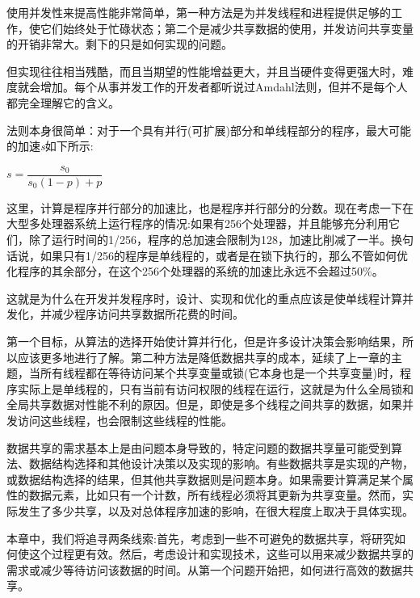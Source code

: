 使用并发性来提高性能非常简单，第一种方法是为并发线程和进程提供足够的工作，使它们始终处于忙碌状态；第二个是减少共享数据的使用，并发访问共享变量的开销非常大。剩下的只是如何实现的问题。

但实现往往相当残酷，而且当期望的性能增益更大，并且当硬件变得更强大时，难度就会增加。每个从事并发工作的开发者都听说过Amdahl法则，但并不是每个人都完全理解它的含义。

法则本身很简单：对于一个具有并行(可扩展)部分和单线程部分的程序，最大可能的加速\textit{s}如下所示:

\begin{center}
$ s = \dfrac{s_0}{s_0(1-p)+p} $
\end{center}

这里，计算是程序并行部分的加速比，也是程序并行部分的分数。现在考虑一下在大型多处理器系统上运行程序的情况:如果有256个处理器，并且能够充分利用它们，除了运行时间的1/256，程序的总加速会限制为128，加速比削减了一半。换句话说，如果只有1/256的程序是单线程的，或者是在锁下执行的，那么不管如何优化程序的其余部分，在这个256个处理器的系统的加速比永远不会超过50\%。

这就是为什么在开发并发程序时，设计、实现和优化的重点应该是使单线程计算并发化，并减少程序访问共享数据所花费的时间。

第一个目标，从算法的选择开始使计算并行化，但是许多设计决策会影响结果，所以应该更多地进行了解。第二种方法是降低数据共享的成本，延续了上一章的主题，当所有线程都在等待访问某个共享变量或锁(它本身也是一个共享变量)时，程序实际上是单线程的，只有当前有访问权限的线程在运行，这就是为什么全局锁和全局共享数据对性能不利的原因。但是，即使是多个线程之间共享的数据，如果并发访问这些线程，也会限制这些线程的性能。

数据共享的需求基本上是由问题本身导致的，特定问题的数据共享量可能受到算法、数据结构选择和其他设计决策以及实现的影响。有些数据共享是实现的产物，或数据结构选择的结果，但其他共享数据则是问题本身。如果需要计算满足某个属性的数据元素，比如只有一个计数，所有线程必须将其更新为共享变量。然而，实际发生了多少共享，以及对总体程序加速的影响，在很大程度上取决于具体实现。

本章中，我们将追寻两条线索:首先，考虑到一些不可避免的数据共享，将研究如何使这个过程更有效。然后，考虑设计和实现技术，这些可以用来减少数据共享的需求或减少等待访问该数据的时间。从第一个问题开始把，如何进行高效的数据共享。
































